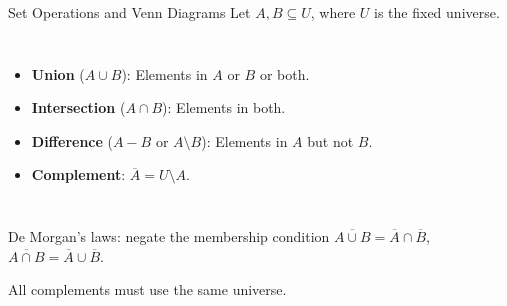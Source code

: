 \documentclass[10pt]{beamer}
\begin{document}
\begin{frame}{Set Operations and Venn Diagrams}
  \small
  Let $A,B\subseteq U$, where $U$ is the fixed universe.
  \begin{columns}[T]
    \begin{itemize}
        \item \textbf{Union} ($A \cup B$): Elements in $A$ or $B$ or both.
        \item \textbf{Intersection} ($A \cap B$): Elements in both.
        \item \textbf{Difference} ($A - B$ or $A \setminus B$): Elements in $A$ but not $B$.
        \item \textbf{Complement}: $\overline{A}=U\setminus A$.
    \end{itemize}
    
    \begin{center}
    \end{center}
  \end{columns}
  \pause
  \begin{block}{De Morgan's laws: negate the membership condition}
    $\overline{A\cup B}=\overline{A}\cap\overline{B}$,
    \qquad $\overline{A\cap B}=\overline{A}\cup\overline{B}$.
    \par\smallskip
    All complements must use the same universe.
  \end{block}
\end{frame}
\end{document}
